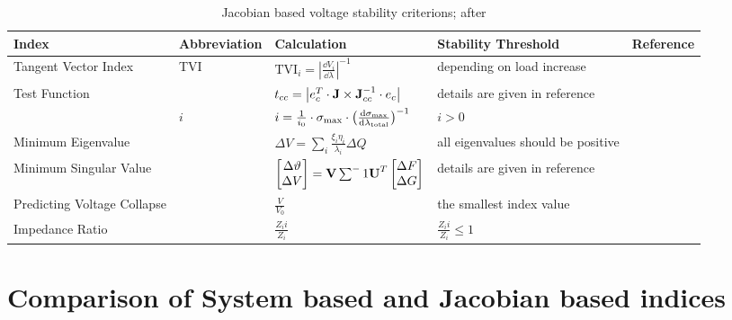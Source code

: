 \begin{sidewaystable}[h!]
    \centering
    \small
    \caption{Jacobian based voltage stability criterions; after \textcite{danishVoltageStabilityElectric2015}}
    \vspace*{12pt}
    \renewcommand{\arraystretch}{2}
    \begin{tabularx}{20cm}{llXXl}
        \textbf{Index} & \textbf{Abbreviation} & \textbf{Calculation} & \textbf{Stability Threshold} & \textbf{Reference} \\
        \toprule
        Tangent Vector Index & \acs{TVI} & $\mathrm{TVI}_i=\left\lvert \frac{\dd{V_i}}{\dd{\lambda}}\right\rvert^{-1}$ & depending on load increase & \\ \midrule
        Test Function & & $t_{cc}=\left\lvert e^T_c \cdot \mathrm{\textbf{J}} \times \mathrm{\textbf{J}}_{cc}^{-1} \cdot e_c\right\rvert$ & details are given in reference & \\ \midrule
        & $i$ & $i=\frac{1}{i_0} \cdot \sigma_\mathrm{max} \cdot \big( \dv{\sigma_\mathrm{max}}{\lambda_\mathrm{total}} \big)^{-1}$ & $i > 0$ & \\ \midrule
        Minimum Eigenvalue & & $\Delta V=\sum_{i} \frac{\xi_i\eta_i}{\lambda_i} \Delta Q$ & all eigenvalues should be positive & \\ \midrule
        Minimum Singular Value & & $\begin{bmatrix} \Delta \vartheta \\ \Delta V \end{bmatrix}=\mathrm{\textbf{V}} \sum^-1 \mathrm{\textbf{U}}^T \begin{bmatrix} \Delta F \\ \Delta G \end{bmatrix}$ & details are given in reference & \\ \midrule
        Predicting Voltage Collapse & & $\frac{V}{V_0}$ & the smallest index value & \\ \midrule
        Impedance Ratio & & $\frac{Z_ii}{Z_i}$ & $\frac{Z_ii}{Z_i} \leq 1$ & \\
        \bottomrule
    \end{tabularx}
\end{sidewaystable}



\section{Comparison of System based and Jacobian based indices}
\label{app:jacobian-vs-system-indices}

